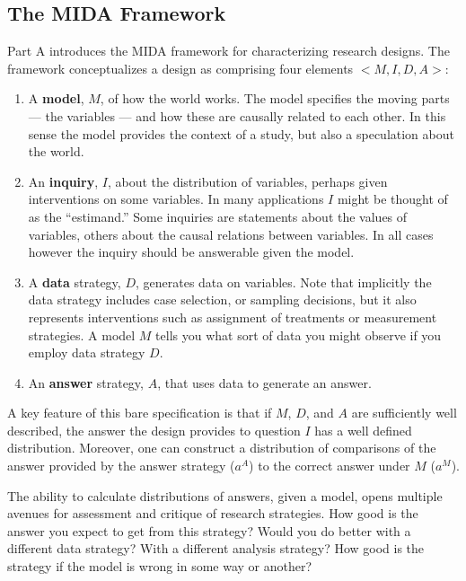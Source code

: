 \documentclass[11pt]{article}
\begin{document}
\subsection{The MIDA Framework}

Part A introduces the MIDA framework for characterizing research designs. The framework conceptualizes a design as comprising four elements $<M,I,D,A>$:
\begin{enumerate}
	\item A \textbf{model}, $M$, of how the world works. The model specifies the moving parts --- the variables --- and how these are causally related to each other. In this sense the model provides the context of a study, but also a speculation about the world.    
	\item An \textbf{inquiry}, $I$, about the distribution of variables, perhaps given interventions on some variables.  In many applications $I$ might be thought of as the ``estimand.'' Some inquiries are statements about the values of variables, others about the causal relations between variables. In all cases however the inquiry should be answerable given the model.   
	\item A \textbf{data} strategy, $D$, generates data on variables.  Note that implicitly the data strategy includes case selection, or sampling decisions, but it also represents interventions such as assignment of treatments or measurement strategies. A model $M$ tells you what sort of data you might observe if you employ data strategy $D$.  
	\item An \textbf{answer} strategy, $A$, that uses data to generate an answer.  
\end{enumerate}

A key feature of this bare specification is that if $M$, $D$, and $A$ are sufficiently well described, the answer the design provides to question $I$ has a well defined distribution. Moreover, one can construct a distribution of comparisons of the answer provided by the answer strategy ($a^A$) to the correct answer under $M$ ($a^M$).

The ability to calculate distributions of answers, given a model, opens multiple avenues for assessment and critique of research strategies. How good is the answer you expect to get from this strategy? Would you do better with a different data strategy? With a different analysis strategy? How good is the strategy if the model is wrong in some way or another? 
\end{document}
